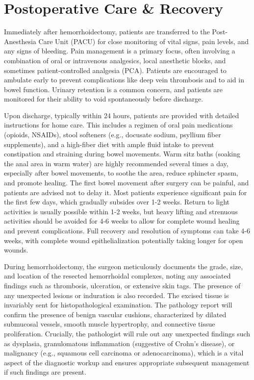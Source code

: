 \section*{Postoperative Care \& Recovery}
Immediately after hemorrhoidectomy, patients are transferred to the Post-Anesthesia Care Unit (PACU) for close monitoring of vital signs, pain levels, and any signs of bleeding. Pain management is a primary focus, often involving a combination of oral or intravenous analgesics, local anesthetic blocks, and sometimes patient-controlled analgesia (PCA). Patients are encouraged to ambulate early to prevent complications like deep vein thrombosis and to aid in bowel function. Urinary retention is a common concern, and patients are monitored for their ability to void spontaneously before discharge.

Upon discharge, typically within 24 hours, patients are provided with detailed instructions for home care. This includes a regimen of oral pain medications (opioids, NSAIDs), stool softeners (e.g., docusate sodium, psyllium fiber supplements), and a high-fiber diet with ample fluid intake to prevent constipation and straining during bowel movements. Warm sitz baths (soaking the anal area in warm water) are highly recommended several times a day, especially after bowel movements, to soothe the area, reduce sphincter spasm, and promote healing. The first bowel movement after surgery can be painful, and patients are advised not to delay it. Most patients experience significant pain for the first few days, which gradually subsides over 1-2 weeks. Return to light activities is usually possible within 1-2 weeks, but heavy lifting and strenuous activities should be avoided for 4-6 weeks to allow for complete wound healing and prevent complications. Full recovery and resolution of symptoms can take 4-6 weeks, with complete wound epithelialization potentially taking longer for open wounds.

During hemorrhoidectomy, the surgeon meticulously documents the grade, size, and location of the resected hemorrhoidal complexes, noting any associated findings such as thrombosis, ulceration, or extensive skin tags. The presence of any unexpected lesions or induration is also recorded. The excised tissue is invariably sent for histopathological examination. The pathology report will confirm the presence of benign vascular cushions, characterized by dilated submucosal vessels, smooth muscle hypertrophy, and connective tissue proliferation. Crucially, the pathologist will rule out any unexpected findings such as dysplasia, granulomatous inflammation (suggestive of Crohn's disease), or malignancy (e.g., squamous cell carcinoma or adenocarcinoma), which is a vital aspect of the diagnostic workup and ensures appropriate subsequent management if such findings are present.

